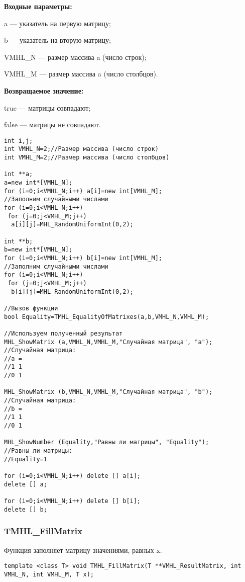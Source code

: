 \documentclass[a4paper,12pt]{article}
\begin{document}
\textbf{Входные параметры:}

a --- указатель на первую матрицу;
 
b --- указатель на вторую матрицу;
 
VMHL\_N --- размер массива a (число строк);
 
VMHL\_M --- размер массива a (число столбцов).

\textbf{Возвращаемое значение:}
 
 true --- матрицы совпадают;
 
false --- матрицы не совпадают.


\begin{lstlisting}[label=code_use_TMHL_EqualityOfMatrixes,caption=Пример использования]
int i,j;
int VMHL_N=2;//Размер массива (число строк)
int VMHL_M=2;//Размер массива (число столбцов)

int **a;
a=new int*[VMHL_N];
for (i=0;i<VMHL_N;i++) a[i]=new int[VMHL_M];
//Заполним случайными числами
for (i=0;i<VMHL_N;i++)
 for (j=0;j<VMHL_M;j++)
  a[i][j]=MHL_RandomUniformInt(0,2);

int **b;
b=new int*[VMHL_N];
for (i=0;i<VMHL_N;i++) b[i]=new int[VMHL_M];
//Заполним случайными числами
for (i=0;i<VMHL_N;i++)
 for (j=0;j<VMHL_M;j++)
  b[i][j]=MHL_RandomUniformInt(0,2);

//Вызов функции
bool Equality=TMHL_EqualityOfMatrixes(a,b,VMHL_N,VMHL_M);

//Используем полученный результат
MHL_ShowMatrix (a,VMHL_N,VMHL_M,"Случайная матрица", "a");
//Случайная матрица:
//a =	
//1	1
//0	1

MHL_ShowMatrix (b,VMHL_N,VMHL_M,"Случайная матрица", "b");
//Случайная матрица:
//b =	
//1	1
//0	1

MHL_ShowNumber (Equality,"Равны ли матрицы", "Equality");
//Равны ли матрицы:
//Equality=1

for (i=0;i<VMHL_N;i++) delete [] a[i];
delete [] a;

for (i=0;i<VMHL_N;i++) delete [] b[i];
delete [] b;
\end{lstlisting}

\subsubsection{TMHL\_FillMatrix}\label{TMHL_FillMatrix}

Функция заполняет матрицу значениями, равных x.


\begin{lstlisting}[label=code_syntax_TMHL_FillMatrix,caption=Синтаксис]
template <class T> void TMHL_FillMatrix(T **VMHL_ResultMatrix, int VMHL_N, int VMHL_M, T x);
\end{lstlisting}
\end{document}

